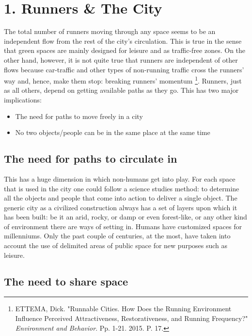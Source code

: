 \section*{1. Runners \& The City}

The total number  of runners moving through any space seems to be an independent flow from the rest of the city's circulation. This is true in the sense that green spaces are mainly designed for leisure and as traffic-free zones. On the  other hand,  however, it is not quite true that runners are independent of other flows because car-traffic and other types of non-running traffic cross the runners’ way and, hence, make them stop: breaking runners' momentum%
\footnote{ETTEMA, Dick. "Runnable Cities. How Does the Running Environment Influence Perceived Attractiveness, Restorativeness, and Running Frequency?" \textit{Environment and Behavior}. Pp. 1-21. 2015. P. 17.}.
Runners, just as all others, depend on getting available paths as they go. This has two major implications:

\begin{itemize}
 \item The need for paths to move freely in a city
 \item No two objects/people can be in the same place at the same time 
\end{itemize}

\subsection*{The need for paths to circulate in}

This has a huge dimension in which non-humans get into play. For each space that is used in the city one could follow a science studies method: to determine all the objects and people that come into action to deliver a single object. The generic city as a civilized construction always has a set of layers upon which it has been built: be it an arid,  rocky, or damp or even forest-like, or any other kind of environment there are ways of setting in. Humans have customized spaces for millenniums. Only the past couple of centuries, at the most, have taken into account the use of delimited areas of public space for new purposes such as leisure.

\subsection*{The need to share space}

